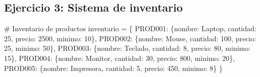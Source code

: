 \documentclass[
  doc,
  floatsintext,
  longtable,
  a4paper,
  nolmodern,
  notxfonts,
  notimes,
  12pt,
  colorlinks=true,linkcolor=blue,citecolor=blue,urlcolor=blue]{apa7}
\newenvironment{Shaded}{\begin{snugshade}}{\end{snugshade}}
\newcommand{\CommentTok}[1]{\textcolor[rgb]{0.37,0.37,0.37}{#1}}
\newcommand{\DecValTok}[1]{\textcolor[rgb]{0.68,0.00,0.00}{#1}}
\newcommand{\NormalTok}[1]{\textcolor[rgb]{0.00,0.23,0.31}{#1}}
\newcommand{\OperatorTok}[1]{\textcolor[rgb]{0.37,0.37,0.37}{#1}}
\newcommand{\StringTok}[1]{\textcolor[rgb]{0.13,0.47,0.30}{#1}}
\begin{document}
\subsection{Ejercicio 3: Sistema de
inventario}\label{ejercicio-3-sistema-de-inventario}

\begin{Shaded}
\begin{Highlighting}[]
\CommentTok{\# Inventario de productos}
\NormalTok{inventario }\OperatorTok{=}\NormalTok{ \{}
    \StringTok{\textquotesingle{}PROD001\textquotesingle{}}\NormalTok{: \{}\StringTok{\textquotesingle{}nombre\textquotesingle{}}\NormalTok{: }\StringTok{\textquotesingle{}Laptop\textquotesingle{}}\NormalTok{, }\StringTok{\textquotesingle{}cantidad\textquotesingle{}}\NormalTok{: }\DecValTok{25}\NormalTok{, }\StringTok{\textquotesingle{}precio\textquotesingle{}}\NormalTok{: }\DecValTok{2500}\NormalTok{, }\StringTok{\textquotesingle{}minimo\textquotesingle{}}\NormalTok{: }\DecValTok{10}\NormalTok{\},}
    \StringTok{\textquotesingle{}PROD002\textquotesingle{}}\NormalTok{: \{}\StringTok{\textquotesingle{}nombre\textquotesingle{}}\NormalTok{: }\StringTok{\textquotesingle{}Mouse\textquotesingle{}}\NormalTok{, }\StringTok{\textquotesingle{}cantidad\textquotesingle{}}\NormalTok{: }\DecValTok{100}\NormalTok{, }\StringTok{\textquotesingle{}precio\textquotesingle{}}\NormalTok{: }\DecValTok{25}\NormalTok{, }\StringTok{\textquotesingle{}minimo\textquotesingle{}}\NormalTok{: }\DecValTok{50}\NormalTok{\},}
    \StringTok{\textquotesingle{}PROD003\textquotesingle{}}\NormalTok{: \{}\StringTok{\textquotesingle{}nombre\textquotesingle{}}\NormalTok{: }\StringTok{\textquotesingle{}Teclado\textquotesingle{}}\NormalTok{, }\StringTok{\textquotesingle{}cantidad\textquotesingle{}}\NormalTok{: }\DecValTok{8}\NormalTok{, }\StringTok{\textquotesingle{}precio\textquotesingle{}}\NormalTok{: }\DecValTok{80}\NormalTok{, }\StringTok{\textquotesingle{}minimo\textquotesingle{}}\NormalTok{: }\DecValTok{15}\NormalTok{\},}
    \StringTok{\textquotesingle{}PROD004\textquotesingle{}}\NormalTok{: \{}\StringTok{\textquotesingle{}nombre\textquotesingle{}}\NormalTok{: }\StringTok{\textquotesingle{}Monitor\textquotesingle{}}\NormalTok{, }\StringTok{\textquotesingle{}cantidad\textquotesingle{}}\NormalTok{: }\DecValTok{30}\NormalTok{, }\StringTok{\textquotesingle{}precio\textquotesingle{}}\NormalTok{: }\DecValTok{800}\NormalTok{, }\StringTok{\textquotesingle{}minimo\textquotesingle{}}\NormalTok{: }\DecValTok{20}\NormalTok{\},}
    \StringTok{\textquotesingle{}PROD005\textquotesingle{}}\NormalTok{: \{}\StringTok{\textquotesingle{}nombre\textquotesingle{}}\NormalTok{: }\StringTok{\textquotesingle{}Impresora\textquotesingle{}}\NormalTok{, }\StringTok{\textquotesingle{}cantidad\textquotesingle{}}\NormalTok{: }\DecValTok{5}\NormalTok{, }\StringTok{\textquotesingle{}precio\textquotesingle{}}\NormalTok{: }\DecValTok{450}\NormalTok{, }\StringTok{\textquotesingle{}minimo\textquotesingle{}}\NormalTok{: }\DecValTok{8}\NormalTok{\}}
\NormalTok{\}}


\end{Highlighting}
\end{Shaded}
\end{document}
